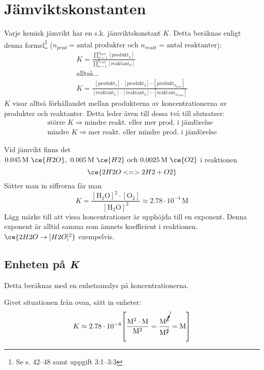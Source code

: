 \section{Jämviktskonstanten}

Varje kemisk jämvikt har en s.k. jämviktskonstant $K$. Detta beräknas enligt denna formel\footnote[1]{Se s. 42--48 samt uppgift 3:1--3:3} ($n_{prod} = \text{antal produkter och } n_{reakt} = \text{antal reaktanter}$):
\begin{gather*}
    K = \frac{\prod_{n=1}^{n_{prod}}[\mathrm{produkt}_n]}{\prod_{n=1}^{n_{reakt}}[\mathrm{reaktant}_n]} \\
    \text{alltså\ldots} \\
    K = \frac{[\mathrm{produkt}_1] \cdot [\mathrm{produkt}_2] \dotsm [\mathrm{produkt}_{n_{prod}}]}{[\mathrm{reaktant}_1] \cdot [\mathrm{reaktant}_2] \dotsm [\mathrm{reaktant}_{n_{reakt}}]}
\end{gather*}
$K$ visar alltså förhållandet mellan produkterna av koncentrationerna av produkter och reaktanter. Detta leder även till dessa två till slutsatser:
\begin{align*}
    \text{större } K \Rightarrow \text{mindre reakt. eller mer prod. i jämförelse} \\
    \text{mindre } K \Rightarrow \text{mer reakt. eller mindre prod. i jämförelse} 
\end{align*}
\pagebreak
\begin{exm}
    Vid jämvikt finns det $ \mathrm{0.045\,M} \ \ce{H2O},\ \mathrm{0.005\,M} \ \ce{H2} \text{ och } \mathrm{0.0025\,M} \ \ce{O2}$ i reaktionen
    \begin{equation*}
        \ce{2H2O <=> 2H2 + O2}
    \end{equation*}
    Sätter man in siffrorna får man
    \begin{equation*}
        K = \frac{\mathrm{[H_2O]^2 \cdot [O_2]}}{\mathrm{[H_2O]^2}} \approx 2.78 \cdot 10^{-4} \, \mathrm{M}
    \end{equation*}
    Lägg märke till att vissa koncentrationer är upphöjda till en exponent. Denna exponent är alltid samma som ämnets koefficient i reaktionen. \\ $\ce{2H2O \rightarrow [H2O]^2}$ exempelvis.
\end{exm}

\subsection{Enheten på \textit{K}}

Detta beräknas med en enhetsanalys på koncentrationerna.

\begin{exm}
    Givet situationen från ovan, sätt in enheter:
    \begin{equation*}
        K \approx 2.78 \cdot 10^{-4} \mathrm{ \left[\frac{M^2 \cdot M}{M^2} = \frac{M^{\cancelto{1}{3}}}{M^{\cancel{2}}} = M\right]}
    \end{equation*}
\end{exm}